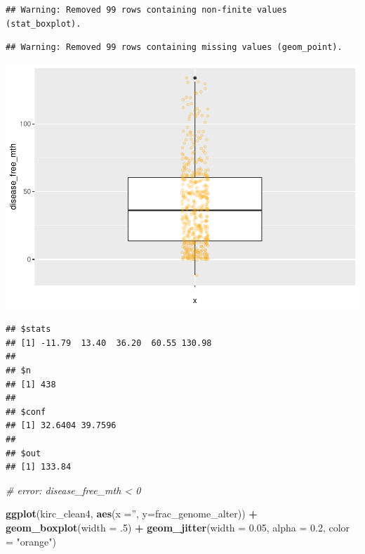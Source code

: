 \documentclass[]{article}
\newenvironment{Shaded}{\begin{snugshade}}{\end{snugshade}}
\newcommand{\KeywordTok}[1]{\textcolor[rgb]{0.13,0.29,0.53}{\textbf{#1}}}
\newcommand{\DataTypeTok}[1]{\textcolor[rgb]{0.13,0.29,0.53}{#1}}
\newcommand{\DecValTok}[1]{\textcolor[rgb]{0.00,0.00,0.81}{#1}}
\newcommand{\FloatTok}[1]{\textcolor[rgb]{0.00,0.00,0.81}{#1}}
\newcommand{\StringTok}[1]{\textcolor[rgb]{0.31,0.60,0.02}{#1}}
\newcommand{\CommentTok}[1]{\textcolor[rgb]{0.56,0.35,0.01}{\textit{#1}}}
\newcommand{\OperatorTok}[1]{\textcolor[rgb]{0.81,0.36,0.00}{\textbf{#1}}}
\newcommand{\NormalTok}[1]{#1}
\begin{document}
\begin{verbatim}
## Warning: Removed 99 rows containing non-finite values (stat_boxplot).
\end{verbatim}

\begin{verbatim}
## Warning: Removed 99 rows containing missing values (geom_point).
\end{verbatim}

\includegraphics{figs/render-unnamed-chunk-17-1.pdf}

\begin{Shaded}
\end{Shaded}

\begin{verbatim}
## $stats
## [1] -11.79  13.40  36.20  60.55 130.98
## 
## $n
## [1] 438
## 
## $conf
## [1] 32.6404 39.7596
## 
## $out
## [1] 133.84
\end{verbatim}

\begin{Shaded}
\begin{Highlighting}[]
\CommentTok{# error: disease_free_mth < 0}
\end{Highlighting}
\end{Shaded}

\begin{Shaded}
\begin{Highlighting}[]
\KeywordTok{ggplot}\NormalTok{(kirc_clean4, }\KeywordTok{aes}\NormalTok{(}\DataTypeTok{x =}\StringTok{''}\NormalTok{, }\DataTypeTok{y=}\NormalTok{frac_genome_alter)) }\OperatorTok{+}
\StringTok{     }\KeywordTok{geom_boxplot}\NormalTok{(}\DataTypeTok{width =}\NormalTok{ .}\DecValTok{5}\NormalTok{) }\OperatorTok{+}
\StringTok{     }\KeywordTok{geom_jitter}\NormalTok{(}\DataTypeTok{width =} \FloatTok{0.05}\NormalTok{, }\DataTypeTok{alpha =} \FloatTok{0.2}\NormalTok{, }\DataTypeTok{color =} \StringTok{"orange"}\NormalTok{)}
\end{Highlighting}
\end{Shaded}
\end{document}
